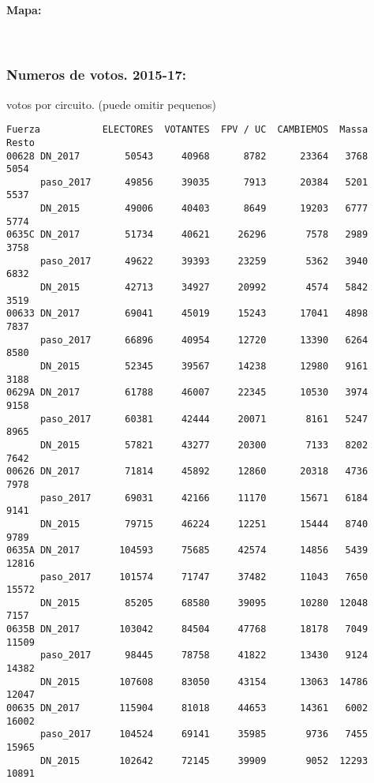 \documentclass[11pt]{article}
\begin{document}
    
    \hypertarget{mapa}{%
\paragraph{Mapa:}\label{mapa}}

    
    \begin{center}
    \end{center}
    { \hspace*{\fill} \\}
    
    \hypertarget{numeros-de-votos.-2015-17}{%
\subsubsection{Numeros de votos.
2015-17:}\label{numeros-de-votos.-2015-17}}

    
    votos por circuito. (puede omitir pequenos)

    
    
    \begin{verbatim}
Fuerza           ELECTORES  VOTANTES  FPV / UC  CAMBIEMOS  Massa  Resto
00628 DN_2017        50543     40968      8782      23364   3768   5054
      paso_2017      49856     39035      7913      20384   5201   5537
      DN_2015        49006     40403      8649      19203   6777   5774
0635C DN_2017        51734     40621     26296       7578   2989   3758
      paso_2017      49622     39393     23259       5362   3940   6832
      DN_2015        42713     34927     20992       4574   5842   3519
00633 DN_2017        69041     45019     15243      17041   4898   7837
      paso_2017      66896     40954     12720      13390   6264   8580
      DN_2015        52345     39567     14238      12980   9161   3188
0629A DN_2017        61788     46007     22345      10530   3974   9158
      paso_2017      60381     42444     20071       8161   5247   8965
      DN_2015        57821     43277     20300       7133   8202   7642
00626 DN_2017        71814     45892     12860      20318   4736   7978
      paso_2017      69031     42166     11170      15671   6184   9141
      DN_2015        79715     46224     12251      15444   8740   9789
0635A DN_2017       104593     75685     42574      14856   5439  12816
      paso_2017     101574     71747     37482      11043   7650  15572
      DN_2015        85205     68580     39095      10280  12048   7157
0635B DN_2017       103042     84504     47768      18178   7049  11509
      paso_2017      98445     78758     41822      13430   9124  14382
      DN_2015       107608     83050     43154      13063  14786  12047
00635 DN_2017       115904     81018     44653      14361   6002  16002
      paso_2017     104524     69141     35985       9736   7455  15965
      DN_2015       102642     72145     39909       9052  12293  10891
    \end{verbatim}
\end{document}
